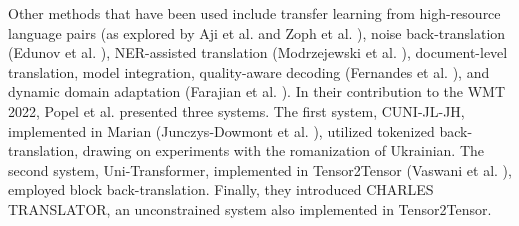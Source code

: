 \documentclass[acmsmall]{acmart}
\begin{document}
Other methods that have been used include transfer learning from high-resource language pairs \cite{6-4} (as explored by Aji et al. \cite{6-4-1} and Zoph et al. \cite{6-4-2}), noise back-translation (Edunov et al. \cite{6-4-3}), NER-assisted translation (Modrzejewski et al. \cite{6-4-4}), document-level translation, model integration, quality-aware decoding (Fernandes et al. \cite{6-4-5}), and dynamic domain adaptation (Farajian et al. \cite{6-4-6}). In their contribution to the WMT 2022, Popel et al. presented three systems. The first system, CUNI-JL-JH, implemented in Marian (Junczys-Dowmont et al. \cite{6-6-1}), utilized tokenized back-translation, drawing on experiments with the romanization of Ukrainian. The second system, Uni-Transformer, implemented in Tensor2Tensor (Vaswani et al. \cite{6-6-2}), employed block back-translation. Finally, they introduced CHARLES TRANSLATOR, an unconstrained system also implemented in Tensor2Tensor.
\end{document}
